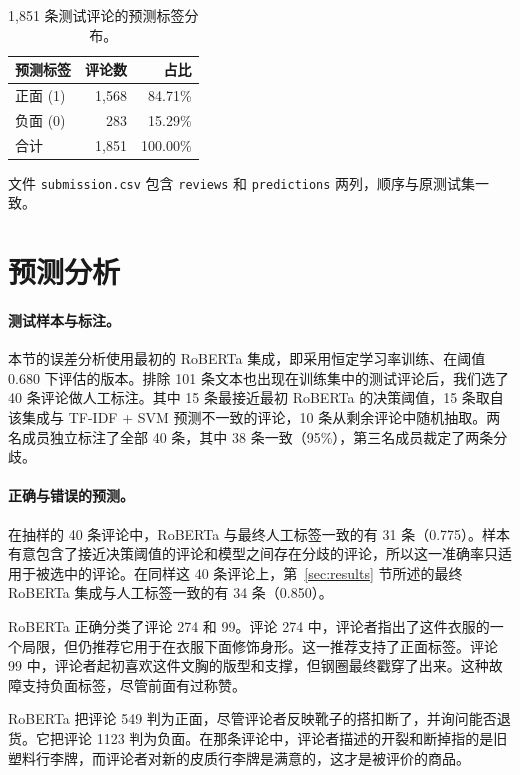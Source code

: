 \documentclass[11pt,a4paper]{article}
\begin{document}
\begin{table}[!htb]
\centering
\caption{1{,}851 条测试评论的预测标签分布。}
\label{tab:e-dist}
\small
\begin{tabular}{lrr}
\toprule
预测标签 & 评论数 & 占比 \\
\midrule
正面 (1) & 1{,}568 & 84.71\% \\
负面 (0) & 283 & 15.29\% \\
\midrule
合计 & 1{,}851 & 100.00\% \\
\bottomrule
\end{tabular}
\end{table}

文件 \texttt{submission.csv} 包含 \texttt{reviews} 和 \texttt{predictions} 两列，顺序与原测试集一致。

\section{预测分析}\label{sec:analysis}

\paragraph{测试样本与标注。}
本节的误差分析使用最初的 RoBERTa 集成，即采用恒定学习率训练、在阈值 0.680 下评估的版本。排除 101 条文本也出现在训练集中的测试评论后，我们选了 40 条评论做人工标注。其中 15 条最接近最初 RoBERTa 的决策阈值，15 条取自该集成与 TF-IDF + SVM 预测不一致的评论，10 条从剩余评论中随机抽取。两名成员独立标注了全部 40 条，其中 38 条一致（95\%），第三名成员裁定了两条分歧。

\paragraph{正确与错误的预测。}
在抽样的 40 条评论中，RoBERTa 与最终人工标签一致的有 31 条（0.775）。样本有意包含了接近决策阈值的评论和模型之间存在分歧的评论，所以这一准确率只适用于被选中的评论。在同样这 40 条评论上，第~\ref{sec:results} 节所述的最终 RoBERTa 集成与人工标签一致的有 34 条（0.850）。

RoBERTa 正确分类了评论 274 和 99。评论 274 中，评论者指出了这件衣服的一个局限，但仍推荐它用于在衣服下面修饰身形。这一推荐支持了正面标签。评论 99 中，评论者起初喜欢这件文胸的版型和支撑，但钢圈最终戳穿了出来。这种故障支持负面标签，尽管前面有过称赞。

RoBERTa 把评论 549 判为正面，尽管评论者反映靴子的搭扣断了，并询问能否退货。它把评论 1123 判为负面。在那条评论中，评论者描述的开裂和断掉指的是旧塑料行李牌，而评论者对新的皮质行李牌是满意的，这才是被评价的商品。
\end{document}
